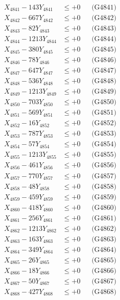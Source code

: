 \documentclass[a4paper,10pt]{article}
\begin{document}
{\begin{align}
\allowbreak
X_{4841} - 143Y_{4841} &\leq +0 && \text{(G4841)} \\
X_{4842} - 667Y_{4842} &\leq +0 && \text{(G4842)} \\
X_{4843} - 82Y_{4843} &\leq +0 && \text{(G4843)} \\
X_{4844} - 1213Y_{4844} &\leq +0 && \text{(G4844)} \\
X_{4845} - 380Y_{4845} &\leq +0 && \text{(G4845)} \\
X_{4846} - 78Y_{4846} &\leq +0 && \text{(G4846)} \\
X_{4847} - 647Y_{4847} &\leq +0 && \text{(G4847)} \\
X_{4848} - 536Y_{4848} &\leq +0 && \text{(G4848)} \\
X_{4849} - 1213Y_{4849} &\leq +0 && \text{(G4849)} \\
X_{4850} - 703Y_{4850} &\leq +0 && \text{(G4850)} \\
\allowbreak
X_{4851} - 569Y_{4851} &\leq +0 && \text{(G4851)} \\
X_{4852} - 16Y_{4852} &\leq +0 && \text{(G4852)} \\
X_{4853} - 787Y_{4853} &\leq +0 && \text{(G4853)} \\
X_{4854} - 57Y_{4854} &\leq +0 && \text{(G4854)} \\
X_{4855} - 1213Y_{4855} &\leq +0 && \text{(G4855)} \\
X_{4856} - 461Y_{4856} &\leq +0 && \text{(G4856)} \\
X_{4857} - 770Y_{4857} &\leq +0 && \text{(G4857)} \\
X_{4858} - 48Y_{4858} &\leq +0 && \text{(G4858)} \\
X_{4859} - 459Y_{4859} &\leq +0 && \text{(G4859)} \\
X_{4860} - 418Y_{4860} &\leq +0 && \text{(G4860)} \\
\allowbreak
X_{4861} - 256Y_{4861} &\leq +0 && \text{(G4861)} \\
X_{4862} - 1213Y_{4862} &\leq +0 && \text{(G4862)} \\
X_{4863} - 163Y_{4863} &\leq +0 && \text{(G4863)} \\
X_{4864} - 349Y_{4864} &\leq +0 && \text{(G4864)} \\
X_{4865} - 26Y_{4865} &\leq +0 && \text{(G4865)} \\
X_{4866} - 18Y_{4866} &\leq +0 && \text{(G4866)} \\
X_{4867} - 50Y_{4867} &\leq +0 && \text{(G4867)} \\
X_{4868} - 427Y_{4868} &\leq +0 && \text{(G4868)} \\

\end{align}}
\end{document}
